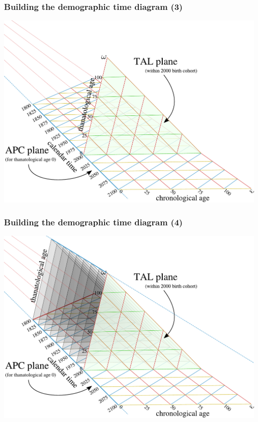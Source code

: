 \documentclass[20pt]{beamer}
\begin{document}
\begin{frame}
\frametitle{Building the demographic time diagram (3)}
\vspace{-1em}
\begin{center}
\includegraphics[scale=.8]{Figures/buildTAL3.pdf}
\end{center}
\end{frame}
\begin{frame}
\frametitle{Building the demographic time diagram (4)}
\vspace{-1em}
\begin{center}
\includegraphics[scale=.8]{Figures/buildTAL4.pdf}
\end{center}
\end{frame}
\end{document}
